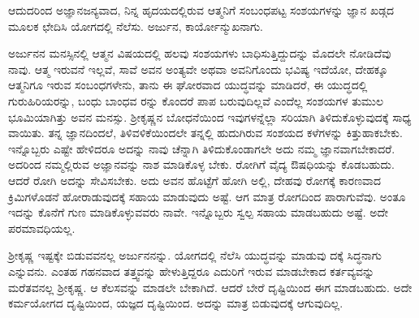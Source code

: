 {\small ಆದುದರಿಂದ ಅಜ್ಞಾನಜನ್ಯವಾದ, ನಿನ್ನ ಹೃದಯದಲ್ಲಿರುವ ಆತ್ಮನಿಗೆ ಸಂಬಂಧಪಟ್ಟ ಸಂಶಯಗಳನ್ನು ಜ್ಞಾನ ಖಡ್ಗದ ಮೂಲಕ ಛೇದಿಸಿ ಯೋಗದಲ್ಲಿ ನೆಲೆಸು. ಅರ್ಜುನ, ಕಾರ್ಯೋನ್ಮುಖನಾಗು.}

ಅರ್ಜುನನ ಮನಸ್ಸಿನಲ್ಲಿ ಆತ್ಮನ ವಿಷಯದಲ್ಲಿ ಹಲವು ಸಂಶಯಗಳು ಬಾಧಿಸುತ್ತಿದ್ದುದನ್ನು ಮೊದಲೇ ನೋಡಿದೆವು ನಾವು. ಆತ್ಮ ಇರುವನೆ ಇಲ್ಲವೆ, ಸಾವೆ ಅವನ ಅಂತ್ಯವೇ ಅಥವಾ ಅವನಿಗೊಂದು ಭವಿಷ್ಯ ಇದೆಯೋ, ದೇಹಕ್ಕೂ ಆತ್ಮನಿಗೂ ಇರುವ ಸಂಬಂಧಗಳೇನು, ತಾನು ಈ ಘೋರವಾದ ಯುದ್ಧವನ್ನು ಮಾಡಿದರೆ, ಈ ಯುದ್ಧದಲ್ಲಿ ಗುರುಹಿರಿಯರನ್ನು, ಬಂಧು ಬಾಂಧವ ರನ್ನು ಕೊಂದರೆ ಪಾಪ ಬರುವುದಿಲ್ಲವೆ ಎಂದೆಲ್ಲ ಸಂಶಯಗಳ ತುಮುಲ ಭೂಮಿಯಾಗಿತ್ತು ಅವನ ಮನಸ್ಸು. ಶ್ರೀಕೃಷ್ಣನ ಬೋಧನೆಯಿಂದ ಇವುಗಳನ್ನೆಲ್ಲಾ ಸರಿಯಾಗಿ ತಿಳಿದುಕೊಳ್ಳುವುದಕ್ಕೆ ಸಾಧ್ಯ ವಾಯಿತು. ತನ್ನ ಜ್ಞಾನದಿಂದಲೆ, ತಿಳಿವಳಿಕೆಯಿಂದಲೇ ತನ್ನಲ್ಲಿ ಹುದುಗಿರುವ ಸಂಶಯದ ಕಳೆಗಳನ್ನು ಕಿತ್ತುಹಾಕಬೇಕು. ಇನ್ನೊಬ್ಬರು ಎಷ್ಟೇ ಹೇಳಿದರೂ ಅದನ್ನು ನಾವು ಚೆನ್ನಾಗಿ ತಿಳಿದುಕೊಂಡಾಗಲೇ ಅದು ನಮ್ಮ ಜ್ಞಾನವಾಗಬೇಕಾದರೆ. ಅದರಿಂದ ನಮ್ಮಲ್ಲಿರುವ ಅಜ್ಞಾನವನ್ನು ನಾಶ ಮಾಡಿಕೊಳ್ಳ ಬೇಕು. ರೋಗಿಗೆ ವೈದ್ಯ ಔಷಧಿಯನ್ನು ಕೊಡಬಹುದು. ಆದರೆ ರೋಗಿ ಅದನ್ನು ಸೇವಿಸಬೇಕು. ಅದು ಅವನ ಹೊಟ್ಟೆಗೆ ಹೋಗಿ ಅಲ್ಲಿ, ದೇಹವು ರೋಗಕ್ಕೆ ಕಾರಣವಾದ ಕ್ರಿಮಿಗಳೊಡನೆ ಹೋರಾಡುವುದಕ್ಕೆ ಸಹಾಯ ಮಾಡುವುದು ಅಷ್ಟೆ. ಆಗ ಮಾತ್ರ ರೋಗದಿಂದ ಪಾರಾಗುವೆವು. ಅಂತೂ ಇದನ್ನು ಕೊನೆಗೆ ಗುಣ ಮಾಡಿಕೊಳ್ಳುವವರು ನಾವೇ. ಇನ್ನೊಬ್ಬರು ಸ್ವಲ್ಪ ಸಹಾಯ ಮಾಡಬಹುದು ಅಷ್ಟೆ. ಅದೇ ಪರಮಾವಧಿಯಲ್ಲ.

ಶ್ರೀಕೃಷ್ಣ ಇಷ್ಟಕ್ಕೇ ಬಿಡುವವನಲ್ಲ ಅರ್ಜುನನನ್ನು. ಯೋಗದಲ್ಲಿ ನೆಲೆಸಿ ಯುದ್ಧವನ್ನು ಮಾಡುವು ದಕ್ಕೆ ಸಿದ್ಧನಾಗು ಎನ್ನುವನು. ಎಂತಹ ಗಹನವಾದ ತತ್ತ್ವವನ್ನು ಹೇಳುತ್ತಿದ್ದರೂ ಎದುರಿಗೆ ಇರುವ ಮಾಡಬೇಕಾದ ಕರ್ತವ್ಯವನ್ನು ಮರೆತವನಲ್ಲ ಶ್ರೀಕೃಷ್ಣ. ಆ ಕೆಲಸವನ್ನು ಮಾಡಲೇ ಬೇಕಾಗಿದೆ. ಆದರೆ ಬೇರೆ ದೃಷ್ಟಿಯಿಂದ ಈಗ ಮಾಡಬಹುದು. ಅದೇ ಕರ್ಮಯೋಗದ ದೃಷ್ಟಿಯಿಂದ, ಯಜ್ಞದ ದೃಷ್ಟಿಯಿಂದ. ಅದನ್ನು ಮಾತ್ರ ಬಿಡುವುದಕ್ಕೆ ಆಗುವುದಿಲ್ಲ.

